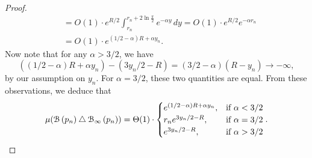 \begin{proof}
\begin{align*}
	&= O(1) \cdot e^{R/2} \int_{r_n}^{r_n + 2 \ln \frac{\pi}{2}} e^{-\alpha y} \, dy 
		= O(1) \cdot e^{R/2} e^{-\alpha r_n} \\
	&=O(1) \cdot e^{(1/2 - \alpha) R + \alpha y_n}.
\end{align*}
Now note that for any $\alpha > 3/2$, we have 
\[
	\left( (1/2 - \alpha) R + \alpha y_n\right) - \left(3y_n/2 - R \right)
	= (3/2 -\alpha) (R- y_n) \to -\infty,
\]
by our assumption on $y_n$. For $\alpha = 3/2$, these two quantities are equal. From these observations, we deduce that 
\[
	\mu ({\mathcal B}\left(p_n\right) \bigtriangleup {\mathcal B}_{\infty}\left(p_n\right) ) 
	= \Theta (1) \cdot \begin{cases} 
		e^{(1/2-\alpha)R + \alpha y_n}, & \mbox{if } \alpha < 3/2 \\
		r_n e^{3y_n/2 - R}, & \mbox{if }\alpha = 3/2\\
		e^{3y_n/2 - R}, &  \mbox{if } \alpha > 3/2 
	\end{cases}.
\]
\end{proof}

